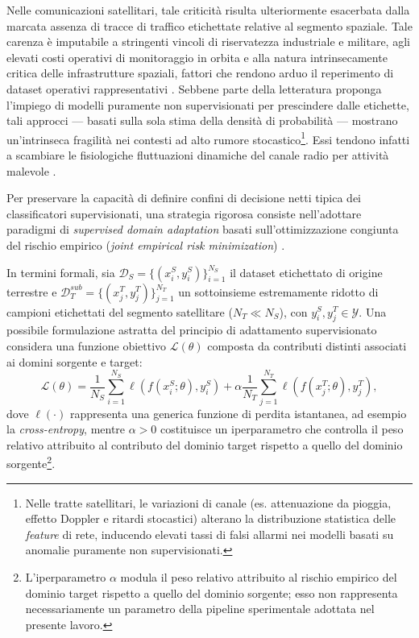 Nelle comunicazioni satellitari, tale criticità risulta ulteriormente esacerbata dalla marcata assenza di tracce di traffico etichettate relative al segmento spaziale. 
Tale carenza è imputabile a stringenti vincoli di riservatezza industriale e militare, agli elevati costi operativi di monitoraggio in orbita e alla natura intrinsecamente critica delle infrastrutture spaziali, fattori che rendono arduo il reperimento di dataset operativi rappresentativi \cite{kodheli2021, azar2023}. 
Sebbene parte della letteratura proponga l'impiego di modelli puramente non supervisionati per prescindere dalle etichette, tali approcci — basati sulla sola stima della densità di probabilità — mostrano un'intrinseca fragilità nei contesti ad alto rumore stocastico\footnote{Nelle tratte satellitari, le variazioni di canale (es. attenuazione da pioggia, effetto Doppler e ritardi stocastici) alterano la distribuzione statistica delle \textit{feature} di rete, inducendo elevati tassi di falsi allarmi nei modelli basati su anomalie puramente non supervisionati.}. 
Essi tendono infatti a scambiare le fisiologiche fluttuazioni dinamiche del canale radio per attività malevole \cite{nist2022, khraisat2019}.

Per preservare la capacità di definire confini di decisione netti tipica dei classificatori supervisionati, una strategia rigorosa consiste nell'adottare paradigmi di \textit{supervised domain adaptation} basati sull'ottimizzazione congiunta del rischio empirico (\textit{joint empirical risk minimization}) \cite{daume2009, motiian2017}.

In termini formali, sia $\mathcal{D}_S = \{(x_i^S, y_i^S)\}_{i=1}^{N_S}$ il dataset etichettato di origine terrestre e $\mathcal{D}_T^{sub} = \{(x_j^T, y_j^T)\}_{j=1}^{N_T}$ un sottoinsieme estremamente ridotto di campioni etichettati del segmento satellitare ($N_T \ll N_S$), con $y_i^S, y_j^T \in \mathcal{Y}$.
Una possibile formulazione astratta del principio di adattamento supervisionato considera una funzione obiettivo $\mathcal{L}(\theta)$ composta da contributi distinti associati ai domini sorgente e target:
\begin{equation}
\mathcal{L}(\theta) =
\frac{1}{N_S}
\sum_{i=1}^{N_S}
\ell\left(f(x_i^S;\theta),y_i^S\right)
+
\alpha
\frac{1}{N_T}
\sum_{j=1}^{N_T}
\ell\left(f(x_j^T;\theta),y_j^T\right),
\label{eq:supervised_da_loss}
\end{equation}
dove $\ell(\cdot)$ rappresenta una generica funzione di perdita istantanea, ad esempio la \textit{cross-entropy}, mentre $\alpha>0$ costituisce un iperparametro che controlla il peso relativo attribuito al contributo del dominio target rispetto a quello del dominio sorgente\footnote{L'iperparametro $\alpha$ modula il peso relativo attribuito al rischio empirico del dominio target rispetto a quello del dominio sorgente; esso non rappresenta necessariamente un parametro della pipeline sperimentale adottata nel presente lavoro.}.

